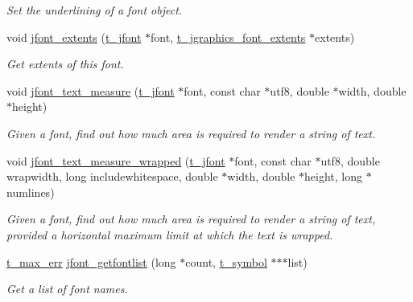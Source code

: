 \begin{DoxyCompactItemize}
\begin{DoxyCompactList}\small\item\em Set the underlining of a font object. \item\end{DoxyCompactList}\item 
void \hyperlink{group__jfont_ga244f386f53aef62b283ff492adc50a73}{jfont\_\-extents} (\hyperlink{group__jfont_ga75f83f853e52af957c799723cac89ae5}{t\_\-jfont} $\ast$font, \hyperlink{structt__jgraphics__font__extents}{t\_\-jgraphics\_\-font\_\-extents} $\ast$extents)
\begin{DoxyCompactList}\small\item\em Get extents of this font. \item\end{DoxyCompactList}\item 
void \hyperlink{group__jfont_gad587e956e70581198b075cb336b4ccce}{jfont\_\-text\_\-measure} (\hyperlink{group__jfont_ga75f83f853e52af957c799723cac89ae5}{t\_\-jfont} $\ast$font, const char $\ast$utf8, double $\ast$width, double $\ast$height)
\begin{DoxyCompactList}\small\item\em Given a font, find out how much area is required to render a string of text. \item\end{DoxyCompactList}\item 
void \hyperlink{group__jfont_ga77610846a756e6da12043d016273d3aa}{jfont\_\-text\_\-measure\_\-wrapped} (\hyperlink{group__jfont_ga75f83f853e52af957c799723cac89ae5}{t\_\-jfont} $\ast$font, const char $\ast$utf8, double wrapwidth, long includewhitespace, double $\ast$width, double $\ast$height, long $\ast$numlines)
\begin{DoxyCompactList}\small\item\em Given a font, find out how much area is required to render a string of text, provided a horizontal maximum limit at which the text is wrapped. \item\end{DoxyCompactList}\item 
\hyperlink{group__datatypes_ga73edaae82b318855cc09fac994918165}{t\_\-max\_\-err} \hyperlink{group__jfont_gaa796e25612596182442bc072e457310d}{jfont\_\-getfontlist} (long $\ast$count, \hyperlink{structt__symbol}{t\_\-symbol} $\ast$$\ast$$\ast$list)
\begin{DoxyCompactList}\small\item\em Get a list of font names. \item\end{DoxyCompactList}\item 

\end{DoxyCompactItemize}
